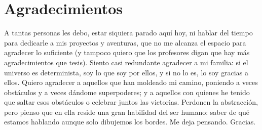 
\chapter*{Agradecimientos}
A tantas personas les debo, estar siquiera parado aquí hoy, ni hablar del tiempo para dedicarle a mis proyectos y aventuras, que no me alcanza el espacio para agradecer lo suficiente (y tampoco quiero que los profesores digan que hay más agradecimientos que tesis). Siento casi redundante agradecer a mi familia: si el universo es determinista, soy lo que soy por ellos, y si no lo es, lo soy gracias a ellos. Quiero agradecer a aquellos que han moldeado mi camino, poniendo a veces obstáculos y a veces dándome superpoderes; y a aquellos con quienes he tenido que saltar esos obstáculos o celebrar juntos las victorias. Perdonen la abstracción, pero pienso que en ella reside una gran habilidad del ser humano: saber de qué estamos hablando aunque solo dibujemos los bordes. Me deja pensando. Gracias.

